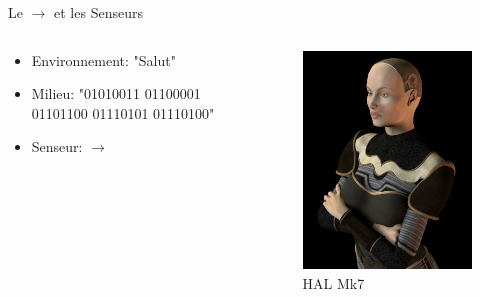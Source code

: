 \documentclass{beamer}
\begin{document}
\begin{frame}{Le $\to$ et les Senseurs}
\begin{columns}
\begin{column}{0.4\textwidth}
\begin{block}{}

\begin{itemize}
    \item Environnement: "Salut"
    \item Milieu: "01010011 01100001 01101100 01110101 01110100"
    \item Senseur: $\to$
\end{itemize}

\end{block}
\end{column}
\begin{column}{0.45\textwidth}
\begin{block}{}
\begin{figure}
    \centering
    \includegraphics[width=\textwidth]{Vis_HAL_Mk7.jpg}
    \caption{HAL Mk7}
    \label{fig:synapto}
\end{figure}
\end{block}
\end{column}
\end{columns}
\end{frame}
\end{document}
